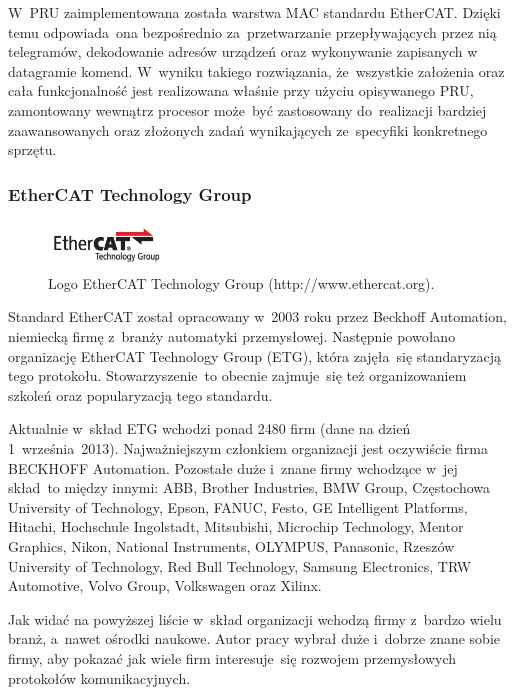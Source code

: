 W~PRU zaimplementowana została warstwa MAC standardu EtherCAT. Dzięki temu odpowiada~ona bezpośrednio za~przetwarzanie przepływających przez nią telegramów, dekodowanie adresów urządzeń oraz wykonywanie zapisanych w datagramie komend. W~wyniku takiego rozwiązania, że~wszystkie założenia oraz cała funkcjonalność jest realizowana właśnie przy użyciu opisywanego PRU, zamontowany wewnątrz procesor może~być zastosowany do~realizacji bardziej zaawansowanych oraz złożonych zadań wynikających ze~specyfiki konkretnego sprzętu.

\subsubsection{EtherCAT Technology Group}
\begin{figure}[!htb] 	\centering 	\includegraphics[width=0.3\textwidth]{images/logoETG} \caption{Logo EtherCAT Technology Group (http://www.ethercat.org).} \label{logoETG} \end{figure}

Standard EtherCAT został opracowany w~2003 roku przez Beckhoff Automation, niemiecką firmę z~branży automatyki przemysłowej. Następnie powołano organizację EtherCAT Technology Group (ETG), która zajęła~się standaryzacją tego protokołu. Stowarzyszenie~to obecnie zajmuje~się też organizowaniem szkoleń oraz popularyzacją tego standardu. 

Aktualnie w~skład ETG wchodzi ponad 2480 firm (dane na dzień 1~września~2013). Najważniejszym członkiem organizacji jest oczywiście firma BECKHOFF Automation. Pozostałe duże i~znane firmy wchodzące w~jej skład~to między innymi: ABB, Brother Industries, BMW Group, Częstochowa University of Technology, Epson, FANUC, Festo, GE Intelligent Platforms, Hitachi, Hochschule Ingolstadt, Mitsubishi, Microchip Technology, Mentor Graphics, Nikon, National Instruments, OLYMPUS, Panasonic, Rzeszów University of Technology, Red Bull Technology, Samsung Electronics, TRW Automotive, Volvo Group, Volkswagen oraz Xilinx.

Jak widać na powyższej liście w~skład organizacji wchodzą firmy z~bardzo wielu branż, a~nawet ośrodki naukowe. Autor pracy wybrał duże i~dobrze znane sobie firmy, aby pokazać jak wiele firm interesuje~się rozwojem przemysłowych protokołów komunikacyjnych.

